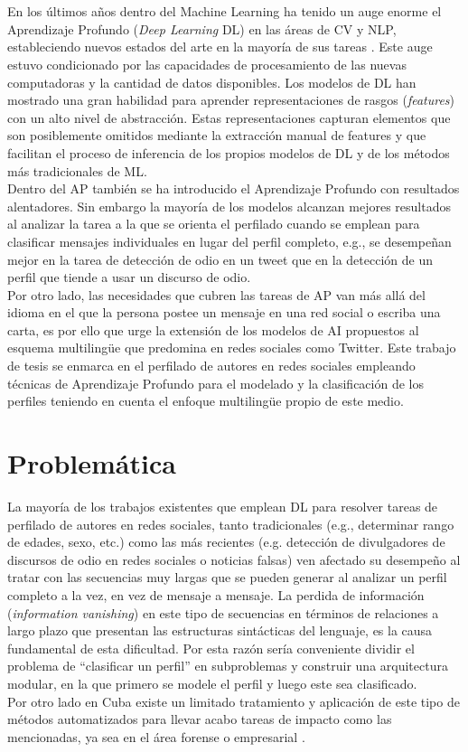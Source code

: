 \\
\\
En los últimos años dentro del Machine Learning ha tenido un auge enorme el Aprendizaje Profundo (\textit{Deep Learning} DL) en las áreas de CV y NLP, estableciendo nuevos estados del arte en la mayoría de sus tareas \citep{electronics8030292}. Este auge estuvo condicionado por las capacidades de procesamiento de las nuevas computadoras y la cantidad de datos disponibles. Los modelos de DL han mostrado una gran habilidad para aprender representaciones de rasgos (\textit{features}) con un alto nivel de abstracción. Estas representaciones capturan elementos que son posiblemente omitidos mediante la extracción manual de features y que facilitan el proceso de inferencia de los propios modelos de DL y de los métodos más tradicionales de ML. 
\\
Dentro del AP también se ha introducido el Aprendizaje Profundo con resultados alentadores. Sin embargo la mayoría de los modelos alcanzan mejores resultados al analizar la tarea a la que se orienta el perfilado cuando se emplean para clasificar mensajes individuales en lugar del perfil completo, e.g., se desempeñan mejor en la tarea de detección de odio en un tweet que en la detección de un perfil que tiende a usar un discurso de odio. 
\\
Por otro lado, las necesidades que cubren las tareas de AP van más allá del idioma en el que la persona postee un mensaje en una red social o escriba una carta, es por ello que urge la extensión de los modelos de AI propuestos al esquema multilingüe que predomina en redes sociales como Twitter. Este trabajo de tesis se enmarca en el perfilado de autores en redes sociales empleando técnicas de Aprendizaje Profundo para el modelado y la clasificación de los perfiles teniendo en cuenta el enfoque multilingüe propio de este medio. 

\section*{Problemática}

La mayoría de los trabajos existentes que emplean DL para resolver tareas de perfilado de autores en redes sociales, tanto tradicionales (e.g., determinar rango de edades, sexo, etc.) como las más recientes (e.g. detección de divulgadores de discursos de odio en redes sociales o noticias falsas) ven afectado su desempeño al tratar con las secuencias muy largas que se pueden generar al analizar un perfil completo a la vez, en vez de mensaje a mensaje. La perdida de información (\textit{information vanishing}) en este tipo de secuencias en términos de relaciones a largo plazo que presentan las estructuras sintácticas del lenguaje, es la causa fundamental de esta dificultad. Por esta razón sería conveniente dividir el problema de ``clasificar un perfil'' en subproblemas y construir una arquitectura modular, en la que primero se modele el perfil y luego este sea clasificado.
\\
Por otro lado en Cuba existe un limitado tratamiento y aplicación de este tipo de métodos automatizados para llevar acabo tareas de impacto como las mencionadas, ya sea en el área forense o empresarial .

